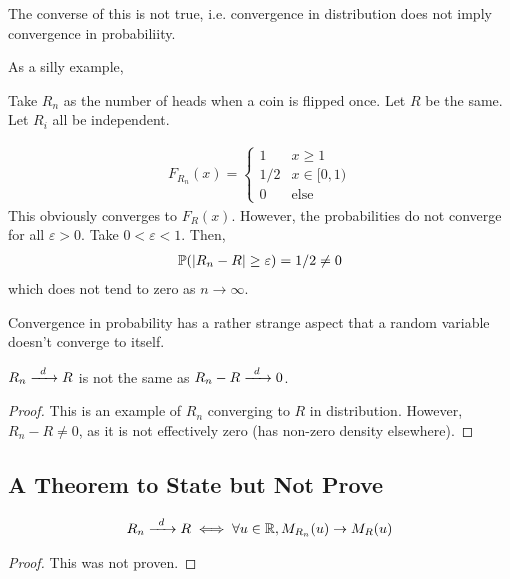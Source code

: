 \begin{lemma}
    The converse of this is not true, i.e. convergence in distribution does not imply convergence in probabiliity.
\end{lemma}

As a silly example,
\begin{example}
    Take $R_n$ as the number of heads when a coin is flipped once. Let $R$ be the same. Let $R_i$ all be independent.
\end{example}
\begin{solution}
    \begin{align}
        F_{R_n}(x) = \begin{cases}
            1 & x \ge 1\\
            1/2 & x \in [0,1)\\
            0 & \text{else}
        \end{cases}
    \end{align}
    This obviously converges to $F_R(x)$. However, the probabilities do not converge for all $\varepsilon > 0$. Take $0 < \varepsilon < 1$. Then,
    \begin{align}
        \mathbb{P}(\abs{R_n - R} \ge \varepsilon) = 1/2 \ne 0
    \end{align}
    which does not tend to zero as $n\to\infty$.
\end{solution}

Convergence in probability has a rather strange aspect that a random variable doesn't converge to itself.

\begin{lemma}
    $R_n \ce{->[$d$]} R$ is not the same as $R_n - R \ce{->[$d$]} 0$.
    \begin{proof}
        This is an example of $R_n$ converging to $R$ in distribution. However, $R_n - R \ne 0$, as it is not effectively zero (has non-zero density elsewhere).
    \end{proof}
\end{lemma}


\subsection{A Theorem to State but Not Prove}
\begin{theorem}
    \begin{align}
        R_n \ce{->[$d$]} R \iff \forall u \in \real, M_{R_n}(u) \to M_R(u)
    \end{align}
    \begin{proof}
        This was not proven.
    \end{proof}
\end{theorem}

